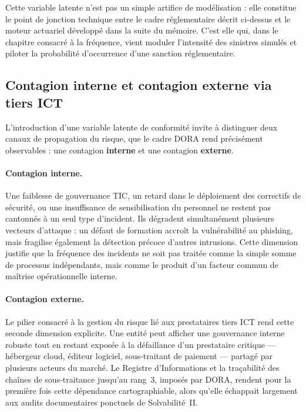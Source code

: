 \documentclass[11pt,a4paper]{article}
\theoremstyle{navystyle}
\theoremstyle{navydef}
\begin{document}
Cette variable latente n'est pas un simple artifice de modélisation : elle
constitue le point de jonction technique entre le cadre réglementaire décrit
ci-dessus et le moteur actuariel développé dans la suite du mémoire. C'est
elle qui, dans le chapitre consacré à la fréquence, vient moduler l'intensité
des sinistres simulés et piloter la probabilité d'occurrence d'une sanction
réglementaire.

\subsection{Contagion interne et contagion externe via tiers ICT}

L'introduction d'une variable latente de conformité invite à distinguer deux
canaux de propagation du risque, que le cadre DORA rend précisément
observables : une contagion \textbf{interne} et une contagion
\textbf{externe}.

\paragraph{Contagion interne.} Une faiblesse de gouvernance TIC, un retard
dans le déploiement des correctifs de sécurité, ou une insuffisance de
sensibilisation du personnel ne restent pas cantonnés à un seul type
d'incident. Ils dégradent simultanément plusieurs vecteurs d'attaque : un
défaut de formation accroît la vulnérabilité au phishing, mais fragilise
également la détection précoce d'autres intrusions. Cette dimension justifie
que la fréquence des incidents ne soit pas traitée comme la simple somme de
processus indépendants, mais comme le produit d'un facteur commun de
maîtrise opérationnelle interne.

\paragraph{Contagion externe.} Le pilier consacré à la gestion du risque lié
aux prestataires tiers ICT rend cette seconde dimension explicite. Une entité
peut afficher une gouvernance interne robuste tout en restant exposée à la
défaillance d'un prestataire critique --- hébergeur cloud, éditeur logiciel,
sous-traitant de paiement --- partagé par plusieurs acteurs du marché. Le
Registre d'Informations et la traçabilité des chaînes de sous-traitance
jusqu'au rang~3, imposés par DORA, rendent pour la première fois cette
dépendance cartographiable, alors qu'elle échappait largement aux audits
documentaires ponctuels de Solvabilité~II.
\end{document}

